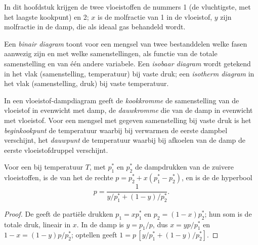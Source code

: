 In dit hoofdstuk krijgen de twee vloeistoffen de nummers 1 (de vluchtigste, met het laagste
kookpunt) en 2; $x$ is de molfractie van 1 in de vloeistof, $y$ zijn
molfractie in de damp, die als ideaal gas behandeld wordt.

\begin{definition}\label{def:b2:liquid-vapour-diagrams:binary-diagram}
Een \emph{binair diagram} toont voor een mengsel van twee
bestanddelen welke fasen aanwezig zijn en met welke samenstellingen, als
functie van de totale samenstelling en van één andere variabele. Een
\emph{isobaar diagram} wordt getekend in het vlak
(samenstelling, temperatuur) bij vaste druk; een \emph{isotherm
diagram} in het vlak (samenstelling, druk) bij
vaste temperatuur.
\end{definition}

\begin{definition}\label{def:b2:liquid-vapour-diagrams:bubble-dew}
In een vloeistof-dampdiagram geeft de \emph{kookkromme}
de samenstelling van de vloeistof in evenwicht met damp, de
\emph{dauwkromme} die van de damp in evenwicht met vloeistof. Voor een
mengsel met gegeven samenstelling bij vaste druk is het
\emph{beginkookpunt} de temperatuur waarbij bij verwarmen de eerste dampbel
verschijnt, het \emph{dauwpunt} de
temperatuur waarbij bij afkoelen van de damp de eerste vloeistofdruppel verschijnt.
\end{definition}

\begin{proposition}\label{prop:b2:liquid-vapour-diagrams:ideal-curves}
Voor een  bij temperatuur $T$, met $p_1^*$ en $p_2^*$ de dampdrukken
van de zuivere vloeistoffen, is de  van het 
de rechte $p = p_2^* + x(p_1^* - p_2^*)$, en is de  de
hyperbool
\[
  p = \frac{1}{y/p_1^* + (1 - y)/p_2^*} .
\]
\end{proposition}

\begin{proof}
De  geeft de partiële drukken $p_1 = xp_1^*$ en $p_2 = (1 -
x)p_2^*$; hun som is de totale druk, lineair in $x$. In de damp is
$y = p_1/p$, dus $x = yp/p_1^*$ en $1 - x = (1 - y)p/p_2^*$; optellen geeft
$1 = p\,[y/p_1^* + (1 - y)/p_2^*]$.
\end{proof}


